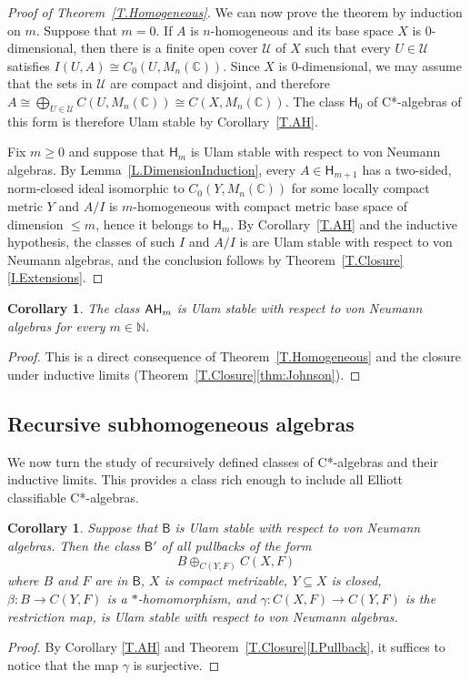 \documentclass[11pt]{amsproc}
\newcommand{\bbN}{\mathbb N}
\newcommand{\cstar}{C*}
\newcommand{\sfB}{\mathsf B}
\newcommand{\sfH}{\mathsf {H}}
\newcommand{\bbC}{\mathbb C}
\newcommand{\cU}{\mathcal U}
\theoremstyle{definition}
\theoremstyle{plain}
\newtheorem{corollary}[definition]{Corollary}
\theoremstyle{remark}
\begin{document}
\begin{proof}
	[Proof of Theorem~\ref{T.Homogeneous}]
We can now prove the theorem by induction on $m$. Suppose that $m=0$. 
If $A$ is $n$-homogeneous and its base space $X$ is 0-dimensional, then there is a finite  open cover $\cU$ of $X$ such that every $U\in \cU$ satisfies $I(U,A)\cong C_0(U,M_n(\bbC))$. Since $X$ is 0-dimensional, we may assume that the sets in $\cU$ are compact and disjoint, and therefore $A\cong \bigoplus_{U\in \cU} C(U,M_n(\bbC))\cong C(X,M_n(\bbC))$.
The class $\sfH_0$ of \cstar-algebras of this form is therefore Ulam stable by Corollary~\ref{T.AH}. 

Fix $m\geq 0$ and suppose that $\sfH_m$ 
 is Ulam stable with respect to von Neumann algebras. By Lemma~\ref{L.DimensionInduction}, every $A\in \sfH_{m+1}$ 
 has a two-sided, norm-closed  ideal isomorphic to 
 $C_0(Y,M_n(\bbC))$ for some locally compact metric $Y$ and $A/I$ is $m$-homogeneous with compact metric base space of dimension $\leq m$, hence it belongs to $\sfH_m$. By Corollary~\ref{T.AH} and the inductive hypothesis, the classes of such $I$ and $A/I$ is are Ulam stable with respect to von Neumann algebras, and the conclusion follows by Theorem~\ref{T.Closure}\eqref{I.Extensions}. 
\end{proof}

\begin{corollary}
The class ${\sf AH}_m$ is Ulam stable with respect to von Neumann algebras for every $m\in \bbN$.	
\end{corollary}
\begin{proof} This is a direct consequence of Theorem~\ref{T.Homogeneous} and the closure under inductive limits (Theorem~\ref{T.Closure}\eqref{thm:Johnson}).
\end{proof}

\subsection{Recursive subhomogeneous algebras}

We now turn the study of recursively defined classes of \cstar-algebras and their inductive limits. This provides a class rich enough to include all Elliott classifiable \cstar-algebras.

\begin{corollary}\label{T.pullback}
	Suppose that $\sfB$ is Ulam stable with respect to von Neumann algebras. Then the class $\sfB'$ of all pullbacks of the form 
	\[
	B\oplus _{C(Y,F)} C(X,F)
	\]
	where $B$ and $F$ are in $\sfB$, $X$ is compact metrizable, $Y\subseteq X$ is closed, $\beta\colon B\to C(Y,F)$ is a $*$-homomorphism, and $\gamma\colon C(X,F)\to C(Y,F)$ is the restriction map, is Ulam stable with respect to von Neumann algebras. 
\end{corollary}
\begin{proof}
	By Corollary \ref{T.AH} and Theorem~\ref{T.Closure}\eqref{I.Pullback}, it suffices to notice that the map $\gamma$ is surjective.
\end{proof}
\end{document}

